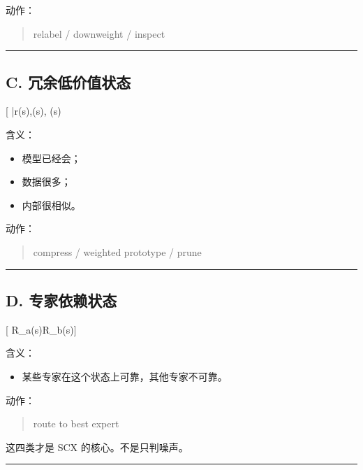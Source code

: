 \documentclass[
  12pt,
]{ctexart}
\providecommand{\tightlist}{%
  \setlength{\itemsep}{0pt}\setlength{\parskip}{0pt}}
\begin{document}
动作：

\begin{quote}
relabel / downweight / inspect
\end{quote}

\begin{center}\rule{0.5\linewidth}{0.5pt}\end{center}

\subsection{C.
冗余低价值状态}\label{c.-ux5197ux4f59ux4f4eux4ef7ux503cux72b6ux6001}

{[} \bar r(s)\downarrow,\quad \rho(s)\uparrow,\quad
{}(s)\uparrow{]}

含义：

\begin{itemize}
\tightlist
\item
  模型已经会；
\item
  数据很多；
\item
  内部很相似。
\end{itemize}

动作：

\begin{quote}
compress / weighted prototype / prune
\end{quote}

\begin{center}\rule{0.5\linewidth}{0.5pt}\end{center}

\subsection{D.
专家依赖状态}\label{d.-ux4e13ux5bb6ux4f9dux8d56ux72b6ux6001}

{[} R\_a(s)\ll R\_b(s){]}

含义：

\begin{itemize}
\tightlist
\item
  某些专家在这个状态上可靠，其他专家不可靠。
\end{itemize}

动作：

\begin{quote}
route to best expert
\end{quote}

这四类才是 SCX 的核心。不是只判噪声。

\begin{center}\rule{0.5\linewidth}{0.5pt}\end{center}
\end{document}
